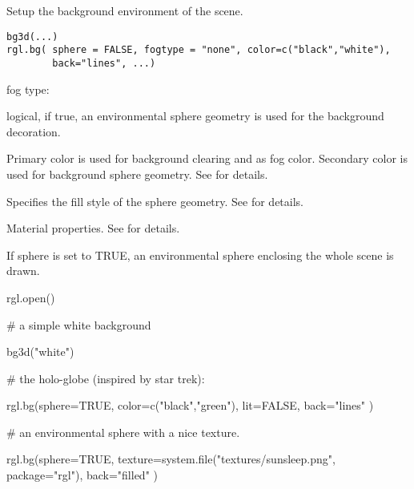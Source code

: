 \begin{Description}\relax
Setup the background environment of the scene.
\end{Description}
\begin{Usage}
\begin{verbatim}
bg3d(...) 
rgl.bg( sphere = FALSE, fogtype = "none", color=c("black","white"), 
        back="lines", ...)

\end{verbatim}
\end{Usage}
\begin{Arguments}
\begin{ldescription}
\item[\code{fogtype}] fog type:

\item[\code{sphere}] logical, if true, an environmental sphere geometry is used for the background decoration.

\item[\code{color}] Primary color is used for background clearing and as fog color.
Secondary color is used for background sphere geometry. See  for details.

\item[\code{back}] Specifies the fill style of the sphere geometry. See  for details.

\item[\code{ ... }] Material properties. See  for details.
\end{ldescription}
\end{Arguments}
\begin{Details}\relax
If sphere is set to TRUE, an environmental sphere enclosing the whole scene is drawn.
\end{Details}
\begin{SeeAlso}\relax
{}
\end{SeeAlso}
\begin{Examples}
\begin{ExampleCode}
  rgl.open()
  
  # a simple white background
  
  bg3d("white")

  # the holo-globe (inspired by star trek):

  rgl.bg(sphere=TRUE, color=c("black","green"), lit=FALSE, back="lines" )

  # an environmental sphere with a nice texture.

  rgl.bg(sphere=TRUE, texture=system.file("textures/sunsleep.png", package="rgl"), 
         back="filled" )
\end{ExampleCode}
\end{Examples}

